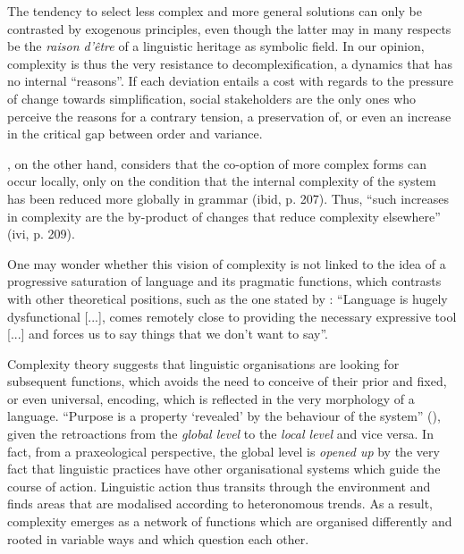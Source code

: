 \documentclass[output=paper]{langscibook}
\begin{document}
The tendency to select less complex and more general solutions can only be contrasted by exogenous principles, even though the latter may in many respects be the \textit{raison d'être} of a linguistic heritage as symbolic field. In our opinion, complexity is thus the very resistance to decomplexification, a dynamics that has no internal “reasons”. If each deviation entails a cost with regards to the pressure of change towards simplification, social stakeholders are the only ones who perceive the reasons for a contrary tension, a preservation of, or even an increase in the critical gap between order and variance. 

\citet{Culicover2013}, on the other hand, considers that the co-option of more complex forms can occur locally, only on the condition that the internal complexity of the system has been reduced more globally in grammar (ibid, p. 207). Thus, “such increases in complexity are the by-product of changes that reduce complexity elsewhere” (ivi, p. 209).

One may wonder whether this vision of complexity is not linked to the idea of a progressive saturation of language and its pragmatic functions, which contrasts with other theoretical positions, such as the one stated by \citet[32]{Gil2009}: “Language is hugely dysfunctional [...], comes remotely close to providing the necessary expressive tool [...] and forces us to say things that we don't want to say”. 

Complexity theory suggests that linguistic organisations are looking for subsequent functions, which avoids the need to conceive of their prior and fixed, or even universal, encoding, which is reflected in the very morphology of a language. “Purpose is a property `revealed' by the behaviour of the system” (\citealt[93]{Dauphiné2003}), given the retroactions from the \textit{global level} to the \textit{local level} and vice versa. In fact, from a praxeological perspective, the global level is \textit{opened up} by the very fact that linguistic practices have other organisational systems which guide the course of action. Linguistic action thus transits through the environment and finds areas that are modalised according to heteronomous trends. As a result, complexity emerges as a network of functions which are organised differently and rooted in variable ways and which question each other. 
\end{document}
